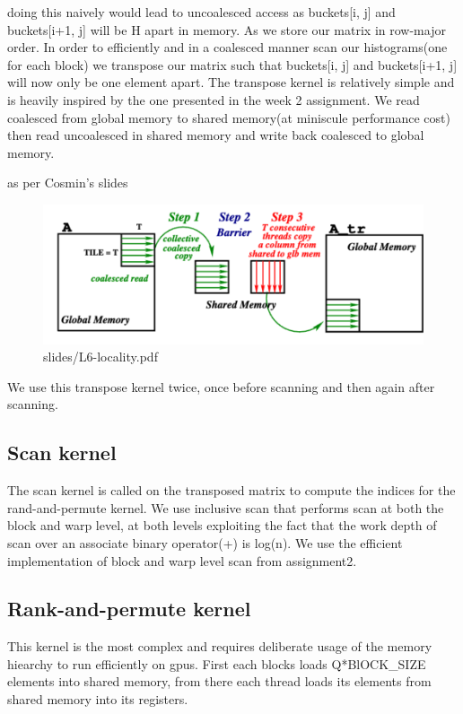 \documentclass{article}
\begin{document}
doing this naively would lead to uncoalesced access as buckets[i, j] and buckets[i+1, j] will be H apart in memory. As we store our matrix in row-major order. In order to efficiently and in a coalesced manner scan our histograms(one for each block) we transpose our matrix such that buckets[i, j] and buckets[i+1, j] will now only be one element apart.
The transpose kernel is relatively simple and is heavily inspired by the one presented in the week 2 assignment. 
We read coalesced from global memory to shared memory(at miniscule performance cost) then read uncoalesced in shared memory and write back coalesced to global memory.

as per Cosmin's slides
\begin{figure}
  \includegraphics[width=1\textwidth]{images/coalesced_transpose.png}
  \caption{slides/L6-locality.pdf}
\end{figure}


We use this transpose kernel twice, once before scanning and then again after scanning.

\subsection{Scan kernel}
The scan kernel is called on the transposed matrix to compute the indices for the rand-and-permute kernel. 
We use inclusive scan that performs scan at both the block and warp level, at both levels exploiting the fact that the work depth of scan over an associate binary operator(+) is log(n). We use the efficient implementation of block and warp level scan from assignment2.

\subsection{Rank-and-permute kernel}

This kernel is the most complex and requires deliberate usage of the memory hiearchy to run efficiently on gpus.
First each blocks loads Q*BlOCK\_SIZE elements into shared memory, from there each thread loads its elements from shared memory into its registers.
\end{document}
